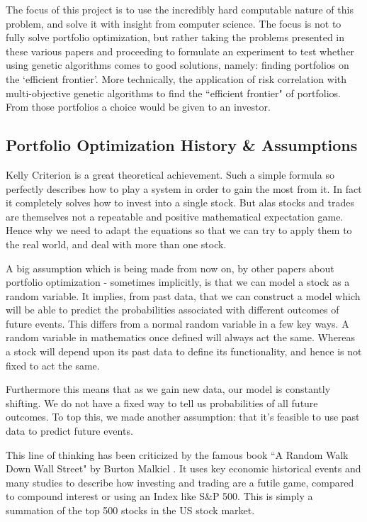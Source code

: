 \documentclass[11pt]{article}
\begin{document}
    The focus of this project is to use the incredibly hard computable nature
    of this problem, and solve it with insight from computer science. The focus
    is not to fully solve portfolio optimization, but rather taking the problems
    presented in these various papers and proceeding to formulate an experiment to test
    whether using genetic algorithms comes to good solutions, namely: finding portfolios on the
    `efficient frontier'. More technically,
    the application of risk correlation with multi-objective genetic algorithms
    to find the ``efficient frontier" of portfolios. From those portfolios a choice
    would be given to an investor.

\subsection{Portfolio Optimization History \& Assumptions}

    Kelly Criterion \cite{Kelly} is a great theoretical achievement. Such a simple formula so
    perfectly describes how to play a system in order to gain the most from it. In fact
    it completely solves how to invest into a single stock. But alas
    stocks and trades are themselves not a repeatable and positive mathematical expectation
    game. Hence why we need to adapt the equations so that we can try to apply them to the
    real world, and deal with more than one stock.

    A big assumption which is being made from now on, by other papers about portfolio
    optimization - sometimes implicitly,
    is that we can model a stock as a random variable. It
    implies, from past data, that we can construct a model which will be able
    to predict the probabilities associated with different outcomes of future events.
    This differs from a normal random variable in a few key ways. A random variable in
    mathematics once defined will always act the same. Whereas a stock will
    depend upon its past data to define its functionality, and hence is not fixed to act
    the same.

    Furthermore this means that as we gain new data, our model is constantly shifting.
    We do not have a fixed way to tell us probabilities of all future outcomes.
    To top this, we made another assumption: that it's feasible to use past data to predict
    future events.

    This line of thinking has been criticized by the famous book ``A Random Walk Down
    Wall Street" by Burton Malkiel \cite{BurtonMalkiel}. It uses
    key economic historical events and many studies to describe how investing and trading are
    a futile game, compared to compound interest or using an Index like S\&P 500. This is
    simply a summation of the top 500 stocks in the US stock market.
\end{document}
